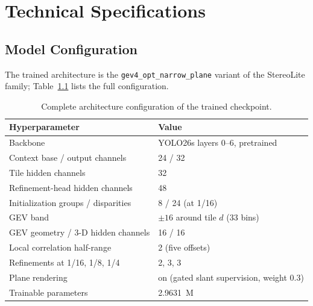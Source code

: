 \chapter{Technical Specifications}
\label{app:specs}

\section{Model Configuration}
The trained architecture is the \texttt{gev4\_opt\_narrow\_plane}
variant of the StereoLite family; Table~\ref{tab:arch_config} lists the
full configuration.

\begin{table}[!htbp]
\centering
\caption{Complete architecture configuration of the trained checkpoint.}
\label{tab:arch_config}
\small
\begin{tabular}{ll}
\toprule
Hyperparameter & Value\\
\midrule
Backbone & YOLO26s layers 0--6, pretrained\\
Context base / output channels & 24 / 32\\
Tile hidden channels & 32\\
Refinement-head hidden channels & 48\\
Initialization groups / disparities & 8 / 24 (at 1/16)\\
GEV band & $\pm 16$ around tile $d$ (33 bins)\\
GEV geometry / 3-D hidden channels & 16 / 16\\
Local correlation half-range & 2 (five offsets)\\
Refinements at 1/16, 1/8, 1/4 & 2, 3, 3\\
Plane rendering & on (gated slant supervision, weight 0.3)\\
Trainable parameters & 2.9631~M\\
\bottomrule
\end{tabular}
\end{table}

